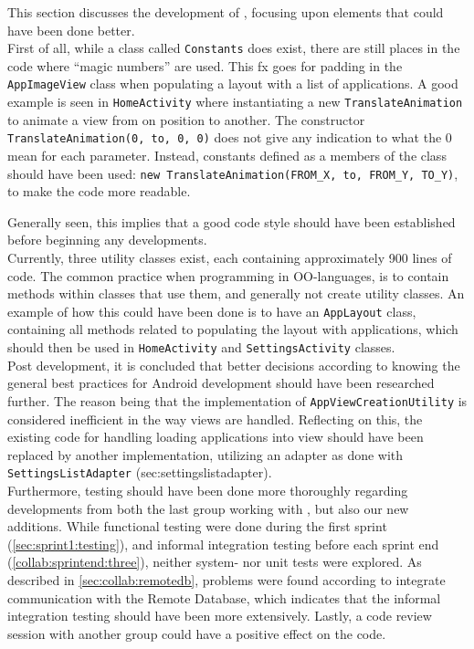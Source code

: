 This section discusses the development of \launcher, focusing upon elements that could have been done better.\\

First of all, while a class called \lstinline|Constants| does exist, there are still places in the code where ``magic numbers'' are used.
This fx goes for padding in the \lstinline|AppImageView| class when populating a layout with a list of applications.
A good example is seen in \lstinline|HomeActivity| where instantiating a new \lstinline|TranslateAnimation| to animate a view from on position to another.
The constructor \lstinline|TranslateAnimation(0, to, 0, 0)| does not give any indication to what the 0 mean for each parameter.
Instead, constants defined as a members of the class should have been used: \lstinline|new TranslateAnimation(FROM_X, to, FROM_Y, TO_Y)|, to make the code more readable.

Generally seen, this implies that a good code style should have been established before beginning any developments.
\\

Currently, three utility classes exist, each containing approximately 900 lines of code. 
The common practice when programming in OO-languages, is to contain methods within classes that use them, and generally not create utility classes.
An example of how this could have been done is to have an \lstinline|AppLayout| class, containing all methods related to populating the layout with applications, which should then be used in \lstinline|HomeActivity| and \lstinline|SettingsActivity| classes.\\


Post development, it is concluded that better decisions according to knowing the general best practices for Android development should have been researched further.
The reason being that the implementation of \lstinline|AppViewCreationUtility| is considered inefficient in the way views are handled.
Reflecting on this, the existing code for handling loading applications into view should have been replaced by another implementation, utilizing an adapter as done with \lstinline|SettingsListAdapter| (sec:settingslistadapter).\\

Furthermore, testing should have been done more thoroughly regarding developments from both the last group working with \launcher, but also our new additions.
While functional testing were done during the first sprint (\cref{sec:sprint1:testing}), and informal integration testing before each sprint end (\cref{collab:sprintend:three}), neither system- nor unit tests were explored.
As described in \cref{sec:collab:remotedb}, problems were found according to integrate communication with the Remote Database, which indicates that the informal integration testing should have been more extensively.
Lastly, a code review session with another group could have a positive effect on the code.